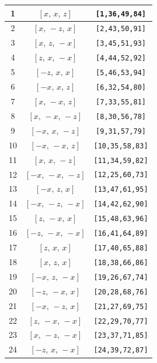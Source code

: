 \documentclass[fleqn,8pt]{jsarticle}
\begin{document}
\begin{longtable}{ccc}
1 & $\left[ x,\, x,\, z \right]$ & {\tt [1,36,49,84]} \\ \hline
2 & $\left[ x,\, - z,\, x \right]$ & {\tt [2,43,50,91]} \\ \hline
3 & $\left[ x,\, z,\, - x \right]$ & {\tt [3,45,51,93]} \\ \hline
4 & $\left[ z,\, x,\, - x \right]$ & {\tt [4,44,52,92]} \\ \hline
5 & $\left[ - z,\, x,\, x \right]$ & {\tt [5,46,53,94]} \\ \hline
6 & $\left[ - x,\, x,\, z \right]$ & {\tt [6,32,54,80]} \\ \hline
7 & $\left[ x,\, - x,\, z \right]$ & {\tt [7,33,55,81]} \\ \hline
8 & $\left[ x,\, - x,\, - z \right]$ & {\tt [8,30,56,78]} \\ \hline
9 & $\left[ - x,\, x,\, - z \right]$ & {\tt [9,31,57,79]} \\ \hline
10 & $\left[ - x,\, - x,\, z \right]$ & {\tt [10,35,58,83]} \\ \hline
11 & $\left[ x,\, x,\, - z \right]$ & {\tt [11,34,59,82]} \\ \hline
12 & $\left[ - x,\, - x,\, - z \right]$ & {\tt [12,25,60,73]} \\ \hline
13 & $\left[ - x,\, z,\, x \right]$ & {\tt [13,47,61,95]} \\ \hline
14 & $\left[ - x,\, - z,\, - x \right]$ & {\tt [14,42,62,90]} \\ \hline
15 & $\left[ z,\, - x,\, x \right]$ & {\tt [15,48,63,96]} \\ \hline
16 & $\left[ - z,\, - x,\, - x \right]$ & {\tt [16,41,64,89]} \\ \hline
17 & $\left[ z,\, x,\, x \right]$ & {\tt [17,40,65,88]} \\ \hline
18 & $\left[ x,\, z,\, x \right]$ & {\tt [18,38,66,86]} \\ \hline
19 & $\left[ - x,\, z,\, - x \right]$ & {\tt [19,26,67,74]} \\ \hline
20 & $\left[ - z,\, - x,\, x \right]$ & {\tt [20,28,68,76]} \\ \hline
21 & $\left[ - x,\, - z,\, x \right]$ & {\tt [21,27,69,75]} \\ \hline
22 & $\left[ z,\, - x,\, - x \right]$ & {\tt [22,29,70,77]} \\ \hline
23 & $\left[ x,\, - z,\, - x \right]$ & {\tt [23,37,71,85]} \\ \hline
24 & $\left[ - z,\, x,\, - x \right]$ & {\tt [24,39,72,87]} \\
\end{longtable}
\end{document}
